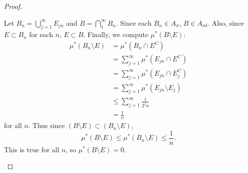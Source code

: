 \documentclass{article}
\theoremstyle{definition}
\begin{document}
\begin{proof}
\begin{enumerate}[label=\textbf{\alph*.}]
		      Let $B_n = \bigcup_{j = 1}^\infty E_{jn}$ and $B = \bigcap_1^\infty B_n$.
		      Since each $B_n \in A_\sigma$, $B \in A_{\sigma\delta}$.
		      Also, since $E \subset B_n$ for each $n$, $E \subset B$.
		      Finally, we compute $\mu^*(B \setminus E)$: \begin{align*}
			      \mu^*(B_n \setminus E) & = \mu^*(B_n \cap E^C)                             \\
			                             & = \sum_{j = 1}^\infty \mu^*(E_{jn} \cap E^C)      \\
			                             & = \sum_{j = 1}^\infty \mu^*(E_{jn} \cap E_j^C)    \\
			                             & = \sum_{j = 1}^\infty \mu^*(E_{jn} \setminus E_j) \\
			                             & \leq \sum_{j = 1}^\infty \frac{1}{2^jn}           \\
			                             & = \frac{1}{n}
		      \end{align*}
		      for all $n$.
		      Thus since $(B \setminus E) \subset (B_n \setminus E)$, \begin{equation*}
			      \mu^*(B \setminus E) \leq \mu^*(B_n \setminus E) \leq \frac{1}{n}.
		      \end{equation*}
		      This is true for all $n$, so $\mu^*(B \setminus E) = 0$.
	\end{enumerate}
\end{proof}
\end{document}
